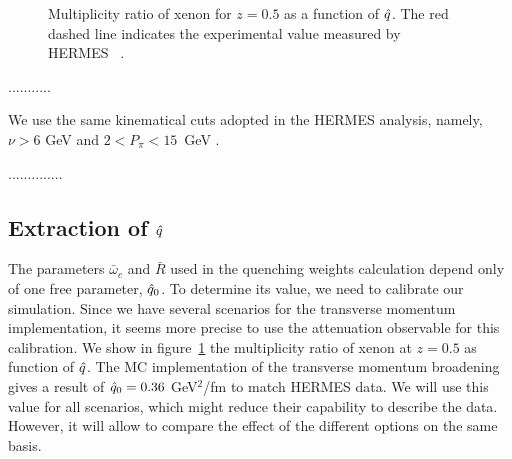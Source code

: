 \begin{figure}[tbp]
  \centering
{}
\caption {Multiplicity ratio of xenon for $z = 0.5$ as a function of ${\hat q}$. 
The red dashed line indicates the experimental value measured by HERMES~%
\cite{Airapetian:2007vu}.}
\label{fig:qhat}
\end{figure}

...........

We use the same kinematical cuts adopted in the HERMES analysis, namely, $\nu > 6$ GeV and $2 < P_\pi < 15$~GeV \cite{Airapetian:2007vu,Airapetian:2009jy}.

..............


\subsection{Extraction of ${\hat q}$}

The parameters $\bar\omega_c$ and $\bar R$ used in the quenching weights 
calculation depend only of one free parameter, ${\hat q}_0$. To determine its 
value, we need to calibrate our simulation. Since we have several scenarios 
for the transverse momentum implementation, it seems more precise to use the 
attenuation observable for this calibration. We show in figure~\ref{fig:qhat} 
the multiplicity ratio of xenon at $z=0.5$ as function of ${\hat q}$. The MC 
implementation of the transverse momentum broadening gives a result of ${\hat q}_0 
= 0.36$ GeV$^2$/fm to match HERMES data. We will use this value for all 
scenarios, which might reduce their capability to describe the data. However, 
it will allow to compare the effect of the different options on the same basis.

